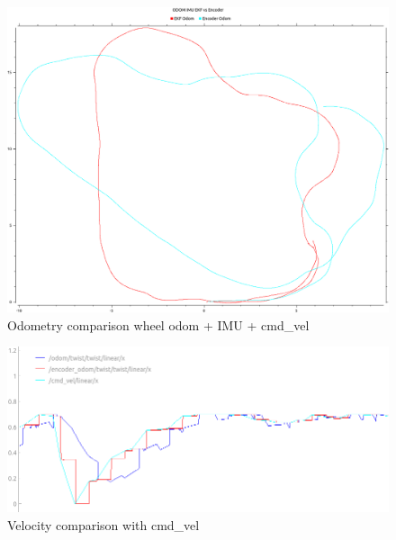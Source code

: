 \begin{figure}[H]
	\includegraphics[width=\textwidth]{Pictures/odom after one round}
	\caption{Odometry comparison wheel odom + IMU + cmd\_vel}
	\label{Odometry comparison wheel odomIMUcmdvel}

\end{figure}
\begin{figure}[H]
	\includegraphics[width=\textwidth]{Pictures/circle vel}
	\caption{Velocity comparison with cmd\_vel}
	\label{velwithcmd}
\end{figure}



